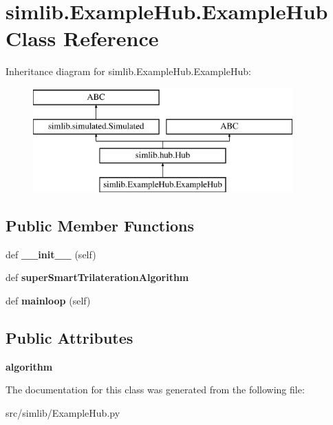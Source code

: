 \hypertarget{classsimlib_1_1_example_hub_1_1_example_hub}{}\section{simlib.\+Example\+Hub.\+Example\+Hub Class Reference}
\label{classsimlib_1_1_example_hub_1_1_example_hub}
Inheritance diagram for simlib.\+Example\+Hub.\+Example\+Hub\+:\begin{figure}[H]
\begin{center}
\leavevmode
\includegraphics[height=4.000000cm]{classsimlib_1_1_example_hub_1_1_example_hub}
\end{center}
\end{figure}
\subsection*{Public Member Functions}
\begin{DoxyCompactItemize}
\item 
\mbox{\label{classsimlib_1_1_example_hub_1_1_example_hub_a5d50debedd25fb1b15a868b42eb00bdc}} 
def {\bfseries \+\_\+\+\_\+init\+\_\+\+\_\+} (self)
\item 
\mbox{\label{classsimlib_1_1_example_hub_1_1_example_hub_a16fd9dc7c4e553dbb3e40cd75fda3b00}} 
def {\bfseries super\+Smart\+Trilateration\+Algorithm}
\item 
\mbox{\label{classsimlib_1_1_example_hub_1_1_example_hub_acd64aed41178435d2195bd169fa86286}} 
def {\bfseries mainloop} (self)
\end{DoxyCompactItemize}
\subsection*{Public Attributes}
\begin{DoxyCompactItemize}
\item 
\mbox{\label{classsimlib_1_1_example_hub_1_1_example_hub_a4c20526f36b9f6266f6686e2ed940042}} 
{\bfseries algorithm}
\end{DoxyCompactItemize}


The documentation for this class was generated from the following file\+:\begin{DoxyCompactItemize}
\item 
src/simlib/Example\+Hub.\+py\end{DoxyCompactItemize}
